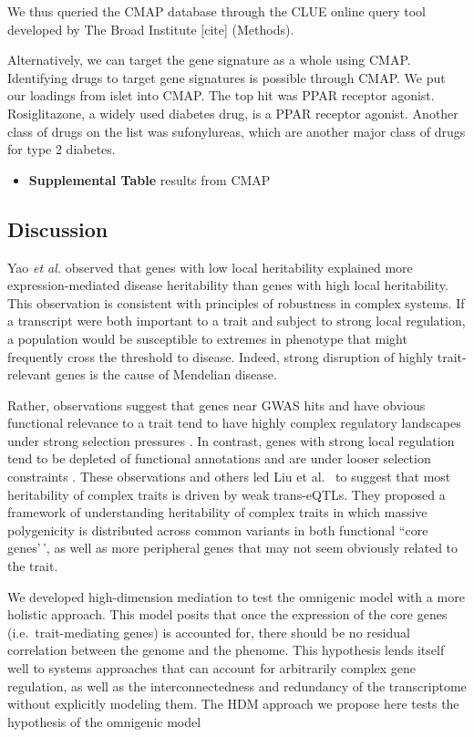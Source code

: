 \documentclass[
]{article}
\providecommand{\tightlist}{%
  \setlength{\itemsep}{0pt}\setlength{\parskip}{0pt}}
\begin{document}
We thus queried the CMAP database through the CLUE online query tool
developed by The Broad Institute {[}cite{]} (Methods).

Alternatively, we can target the gene signature as a whole using CMAP.
Identifying drugs to target gene signatures is possible through CMAP. We
put our loadings from islet into CMAP. The top hit was PPAR receptor
agonist. Rosiglitazone, a widely used diabetes drug, is a PPAR receptor
agonist. Another class of drugs on the list was sufonylureas, which are
another major class of drugs for type 2 diabetes.

\begin{itemize}
\tightlist
\item
  \textbf{Supplemental Table} results from CMAP
\end{itemize}

\subsection{Discussion}\label{discussion}

Yao \textit{et al.} \cite{pmid32424349} observed that genes with low
local heritability explained more expression-mediated disease
heritability than genes with high local heritability. This observation
is consistent with principles of robustness in complex systems. If a
transcript were both important to a trait and subject to strong local
regulation, a population would be susceptible to extremes in phenotype
that might frequently cross the threshold to disease. Indeed, strong
disruption of highly trait-relevant genes is the cause of Mendelian
disease.

Rather, observations suggest that genes near GWAS hits and have obvious
functional relevance to a trait tend to have highly complex regulatory
landscapes under strong selection pressures \cite{pmid37857933}. In
contrast, genes with strong local regulation tend to be depleted of
functional annotations and are under looser selection constraints
\cite{pmid37857933}. These observations and others led Liu et al.~
\cite{pmid31051098} to suggest that most heritability of complex traits
is driven by weak trans-eQTLs. They proposed a framework of
understanding heritability of complex traits in which massive
polygenicity is distributed across common variants in both functional
``core genes'\,', as well as more peripheral genes that may not seem
obviously related to the trait.

We developed high-dimension mediation to test the omnigenic model with a
more holistic approach. This model posits that once the expression of
the core genes (i.e.~trait-mediating genes) is accounted for, there
should be no residual correlation between the genome and the phenome.
This hypothesis lends itself well to systems approaches that can account
for arbitrarily complex gene regulation, as well as the
interconnectedness and redundancy of the transcriptome without
explicitly modeling them. The HDM approach we propose here tests the
hypothesis of the omnigenic model
\end{document}
